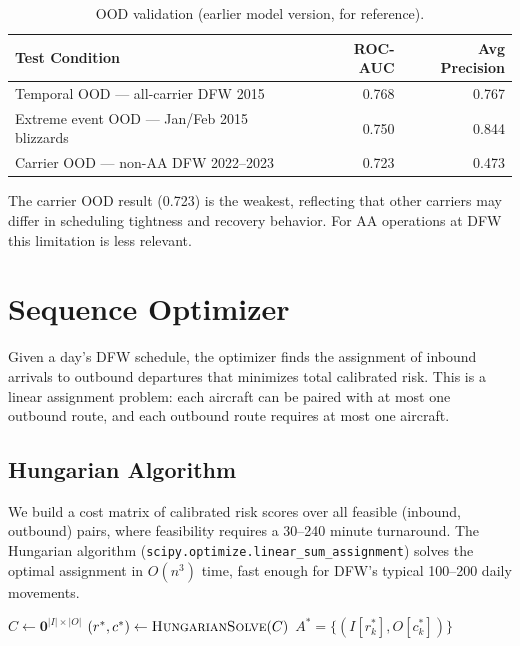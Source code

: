 \documentclass[11pt, twoside]{article}
\begin{document}
\begin{table}[H]
\centering
\caption{OOD validation (earlier model version, for reference).}
\label{tab:ood}
\begin{tabular}{lrr}
\toprule
Test Condition & ROC-AUC & Avg Precision \\
\midrule
Temporal OOD --- all-carrier DFW 2015 & 0.768 & 0.767 \\
Extreme event OOD --- Jan/Feb 2015 blizzards & 0.750 & 0.844 \\
Carrier OOD --- non-AA DFW 2022--2023 & 0.723 & 0.473 \\
\bottomrule
\end{tabular}
\end{table}

The carrier OOD result (0.723) is the weakest, reflecting that other carriers
may differ in scheduling tightness and recovery behavior.  For AA operations
at DFW this limitation is less relevant.

\clearpage
\section{Sequence Optimizer}
\label{sec:optimizer}

Given a day's DFW schedule, the optimizer finds the assignment of inbound
arrivals to outbound departures that minimizes total calibrated risk.  This
is a linear assignment problem: each aircraft can be paired with at most one
outbound route, and each outbound route requires at most one aircraft.

\subsection{Hungarian Algorithm}

We build a cost matrix of calibrated risk scores over all feasible
(inbound, outbound) pairs, where feasibility requires a 30--240 minute
turnaround.  The Hungarian algorithm (\texttt{scipy.optimize.linear\_sum\_assignment})
solves the optimal assignment in $O(n^3)$ time, fast enough for DFW's typical
100--200 daily movements.

\begin{algorithm}[H]
\caption{DFW Sequence Optimizer}
\label{alg:optimizer}
$C \gets \mathbf{0}^{|I| \times |O|}$\;
$(r^*, c^*) \gets \textsc{HungarianSolve}(C)$\;
\Return $A^* = \{(I[r^*_k], O[c^*_k])\}$
\end{algorithm}
\end{document}
